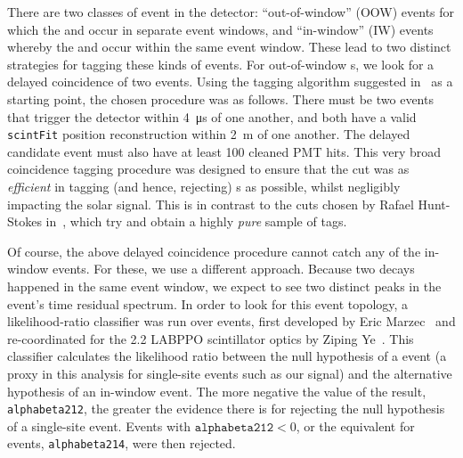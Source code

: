 There are two classes of  event in the detector: ``out-of-window'' (OOW) events for which the  and  occur in separate event windows, and ``in-window'' (IW) events whereby the  and  occur within the same event window. These lead to two distinct strategies for tagging these kinds of events. For out-of-window s, we look for a delayed coincidence of two events. Using the tagging algorithm suggested in~\cite{wilsonBiPoRejectionFactors2017,kroupovaImprovingSensitivityNeutrinoless2020} %
as a starting point, the chosen procedure was as follows. There must be two events that trigger the detector within \SI{4}{\micro\second} of one another, and both have a valid \texttt{scintFit} position reconstruction within \SI{2}{\metre} of one another. The delayed candidate event must also have at least 100 cleaned PMT hits. %
This very broad coincidence tagging procedure was designed to ensure that the cut was as \textit{efficient} in tagging (and hence, rejecting) s as possible, whilst negligibly impacting the solar signal. This is in contrast to the cuts chosen by Rafael Hunt-Stokes in~\cite{hunt-stokesUraniumThoriumBackground2022}, %
which try and obtain a highly \textit{pure} sample of  tags.

Of course, the above delayed coincidence procedure cannot catch any of the in-window  events. For these, we use a different approach. Because two decays happened in the same event window, we expect to see two distinct peaks in the event's time residual spectrum. In order to look for this event topology, a likelihood-ratio classifier was run over events, first developed by Eric Marzec~\cite{marzecBiPoEventReduction2013} %
and re-coordinated for the \SI{2.2}{\gpl} LABPPO scintillator optics by Ziping Ye~\cite{yeTaggingInwindowBiPo2022}. %
This classifier calculates the likelihood ratio between the null hypothesis of a \onbb{} event (a proxy in this analysis for single-site events such as our \beight{} signal) and the alternative hypothesis of an in-window  event. The more negative the value of the result, \texttt{alphabeta212}, the greater the evidence there is for rejecting the null hypothesis of a single-site event. Events with $\texttt{alphabeta212} < 0$, %
or the equivalent for  events, \texttt{alphabeta214}, were then rejected.

